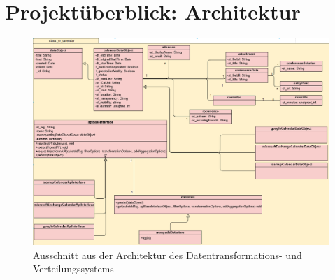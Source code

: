 \section{Projektüberblick: Architektur}


\begin{figure}
	\centering
	\includegraphics[width=\textwidth]{pics/architecture.png}	
	\caption{Ausschnitt aus der Architektur des Datentransformations- und Verteilungssystems}
	\label{fig:architectur}
\end{figure}

